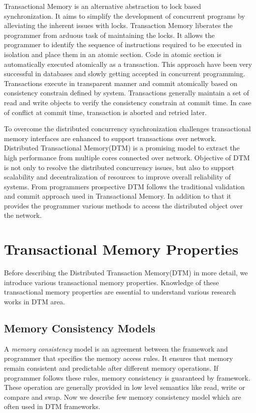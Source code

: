\documentclass[12pt,english]{report}
\begin{document}
Transactional Memory is an alternative abstraction to lock based synchronization. It aims to simplify the development of concurrent programs by alleviating the inherent issues with locks. Transaction Memory liberates the programmer from arduous task of maintaining the locks. It allows the programmer to identify the  sequence of instructions required to be executed in isolation and place them in an atomic section. Code in atomic section is automatically executed atomically as a transaction. This approach have been very successful in databases and slowly getting accepted in concurrent programming. Transactions execute in transparent manner and commit atomically based on consistency constrain defined by system. Transactions generally maintain a set of read and write objects to verify the consistency constrain at commit time. In case of conflict at commit time, transaction is aborted and retried later.      

To overcome the distributed concurrency synchronization challenges transactional memory interfaces are enhanced to support transactions over network. Distributed Transactional Memory(DTM) is a promising model to extract the high performance from multiple cores connected over network. Objective of DTM is not only to resolve the distributed concurrency issues, but also to support scalability and decentralization of resources to improve overall reliability of systems. From programmers prospective DTM follows the traditional validation and commit approach used in Transactional Memory. In addition to that it provides the programmer various methods to access the distributed object over the network. 

\section{Transactional Memory Properties}

Before describing the Distributed Transaction Memory(DTM) in more detail, we introduce various transactional memory properties. Knowledge of these transactional memory properties are essential to understand various research works in DTM area.

\subsection{Memory Consistency Models}

A \textit{memory consistency} model is an agreement between the framework and programmer that specifies the memory access rules. It ensures that memory remain consistent and predictable after different memory operations. If programmer follows these rules, memory consistency is guaranteed by framework. These operation are generally provided in low level semantics like read, write or compare and swap. Now we describe few memory consistency model which are often used in DTM frameworks.
\end{document}
